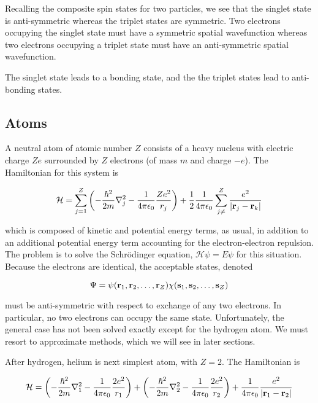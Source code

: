 \documentclass[12pt, titlepage]{article}
\begin{document}
Recalling the composite spin states for two particles, we see that the singlet state is anti-symmetric whereas the triplet states are symmetric. Two electrons occupying the singlet state must have a symmetric spatial wavefunction whereas two electrons occupying a triplet state must have an anti-symmetric spatial wavefunction.

The singlet state leads to a bonding state, and the the triplet states lead to anti-bonding states.

\subsection{Atoms}
A neutral atom of atomic number $Z$ consists of a heavy nucleus with electric charge $Ze$ surrounded by $Z$ electrons (of mass $m$ and charge $-e$). The Hamiltonian for this system is

\begin{equation}
	\mathcal{H} = \sum_{j=1}^{Z}\qty(-\frac{\hbar^2}{2m}\laplacian{}_j - \frac{1}{4\pi\epsilon_0}\frac{Ze^2}{r_j}) + \frac{1}{2}\frac{1}{4\pi\epsilon_0}\sum_{j\neq}^{Z}\frac{e^2}{|\vb{r}_j - \vb{r}_k|}
\end{equation}

which is composed of kinetic and potential energy terms, as usual, in addition to an additional potential energy term accounting for the electron-electron repulsion. The problem is to solve the Schrödinger equation, $\mathcal{H}\psi = E\psi$ for this situation. Because the electrons are identical, the acceptable states, denoted

\begin{equation}
	\Psi = \psi(\vb{r}_1, \vb{r}_2,\ldots,\vb{r}_Z)\chi(\vb{s}_1, \vb{s}_2,\ldots,\vb{s}_Z)
\end{equation}

must be anti-symmetric with respect to exchange of any two electrons. In particular, no two electrons can occupy the same state. Unfortunately, the general case has not been solved exactly except for the hydrogen atom. We must resort to approximate methods, which we will see in later sections.

After hydrogen, helium is next simplest atom, with $Z=2$. The Hamiltonian is

\begin{equation}
	\mathcal{H} = \qty(-\frac{\hbar^2}{2m}\laplacian{}_{1} - \frac{1}{4\pi\epsilon_0}\frac{2e^2}{r_1}) + \qty(-\frac{\hbar^2}{2m}\laplacian{}_{2} - \frac{1}{4\pi\epsilon_0}\frac{2e^2}{r_2}) + \frac{1}{4\pi\epsilon_0}\frac{e^2}{|\vb{r}_1-\vb{r}_2|}
\end{equation}
\end{document}
